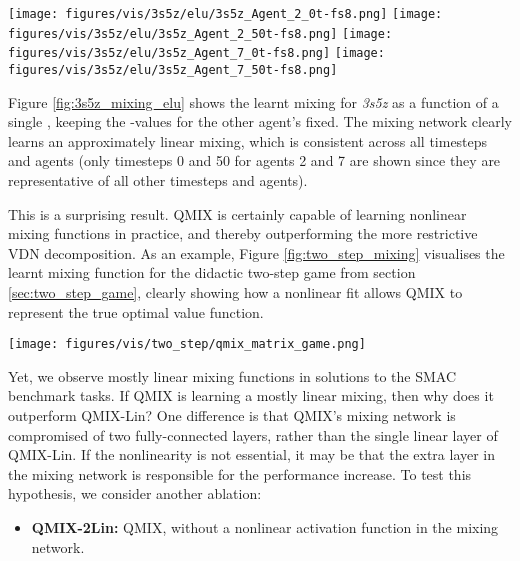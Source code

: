 \documentclass[twoside,11pt]{article}
\begin{document}
\begin{figure*}[h!]
    \centering
    \texttt{[image: figures/vis/3s5z/elu/3s5z\_Agent\_2\_0t-fs8.png]}
    \texttt{[image: figures/vis/3s5z/elu/3s5z\_Agent\_2\_50t-fs8.png]}
    \texttt{[image: figures/vis/3s5z/elu/3s5z\_Agent\_7\_0t-fs8.png]}
    \texttt{[image: figures/vis/3s5z/elu/3s5z\_Agent\_7\_50t-fs8.png]}
    \caption{The learnt mixing of QMIX on \textit{3s5z} at the end of training for timesteps 0 (left) and 50 (right), for agents 2 (top) and 7 (bottom).}
    \label{fig:3s5z_mixing_elu}
\end{figure*}

Figure \ref{fig:3s5z_mixing_elu} shows the learnt mixing for \textit{3s5z} as a function of a single , keeping the -values for the other agent's fixed.
The mixing network clearly learns an approximately linear mixing, which is 
consistent across all timesteps and agents (only timesteps 0 and 50 for agents 
2 and 7 are shown since they are representative of all other timesteps and 
agents).

This is a surprising result. QMIX is certainly capable of learning nonlinear 
mixing functions in practice, and thereby outperforming the more restrictive 
VDN decomposition.
As an example, Figure \ref{fig:two_step_mixing} visualises the learnt mixing 
function for the didactic two-step game from section \ref{sec:two_step_game}, 
clearly showing how a nonlinear fit allows QMIX to represent the true optimal 
value function.

\begin{figure*}[h!]
	\centering
	\texttt{[image: figures/vis/two\_step/qmix\_matrix\_game.png]}
	\caption{The learnt mixing of QMIX on the two-step game from Section 
	\ref{sec:two_step_game}.}
	\label{fig:two_step_mixing}
\end{figure*}

Yet, we observe mostly linear mixing functions in solutions to the SMAC 
benchmark tasks.
If QMIX is learning a mostly linear mixing, then why does it outperform QMIX-Lin?
One difference is that QMIX's mixing network is compromised of two 
fully-connected layers, rather than the single linear layer of QMIX-Lin.
If the nonlinearity is not essential, it may be that the extra layer in the 
mixing network is responsible for the performance increase.
To test this hypothesis, we consider another ablation:

\begin{itemize}
    \item \textbf{QMIX-2Lin:} QMIX, without a nonlinear activation function in the mixing network.
\end{itemize}
\end{document}
